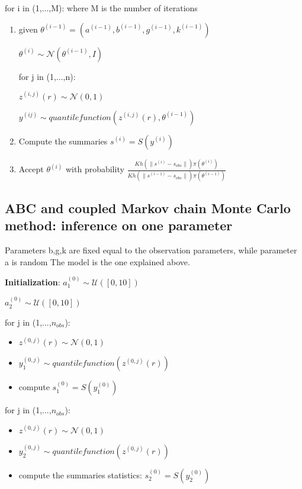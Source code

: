 \documentclass{article}
\begin{document}
for i in (1,...,M): where M is the number of iterations
\begin{enumerate}
	\item given $\theta^{(i-1)}=(a^{(i-1)},b^{(i-1)},g^{(i-1)},k^{(i-1)})$
	
	$\theta^{(i)} \sim \mathcal{N}(\theta^{(i-1)},I)$
	
	for j in (1,...,n):
	
	$z^{(i,j)}(r) \sim \mathcal{N}(0,1)$
	
	$ y^{(ij)} \sim quantile function(z^{(i,j)}(r), \theta^{(i-1)})$
	
	
	\item Compute the summaries  $ s^{(i)} =S(y^{(i)})$
	
	\item Accept $\theta^{(i)}$ with probability $\frac{Kh(\|s^{(i)}-s_{obs}\|)\pi(\theta^{(i)})}{Kh(\|s^{(i-1)}-s_{obs}\|)\pi(\theta^{(i-1)})}$
	
\end{enumerate} 

	
	\subsection{ABC and coupled Markov chain Monte Carlo method: inference on one parameter}
	
Parameters b,g,k are fixed equal to the observation parameters, while parameter a is random
The model is the one explained above.

\textbf{Initialization}:
$ a_{1}^{(0)} \sim \mathcal{U}([0,10])$

$ a_{2}^{(0)} \sim \mathcal{U}([0,10])$

for j in (1,...,$n_{obs}$):
\begin{itemize}
	\item $z^{(0,j)}(r) \sim \mathcal{N}(0,1)  $
	
	\item $ y_{1}^{(0,j)} \sim quantile function(z^{(0,j)}(r))$
	
	\item compute $ s_{1}^{(0)} =S(y_{1}^{(0)})$
\end{itemize}
for j in (1,...,$n_{obs}$):

\begin{itemize}
	\item $z^{(0,j)}(r) \sim \mathcal{N}(0,1)  $
	
	\item $ y_{2}^{(0,j)} \sim quantile function(z^{(0,j)}(r))$
	
	\item compute the summaries statistics:
	$ s_{2}^{(0)} =S(y_{2}^{(0)})$
\end{itemize}
\end{document}
